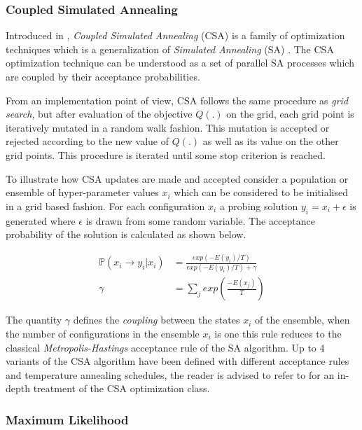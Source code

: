 \documentclass{article}
\begin{document}
\subsubsection*{Coupled Simulated Annealing}

Introduced in \citet{Xavier-De-Souza2010}, \emph{Coupled Simulated Annealing} (CSA) is a family of optimization techniques which is a generalization of \emph{Simulated Annealing} (SA) \citep{Kirkpatrick671}. The CSA optimization technique can be understood as a set of parallel SA processes which are coupled by their acceptance probabilities.

From an implementation point of view, CSA follows the same procedure as \emph{grid search}, but after evaluation of the objective $Q(.)$ on the grid, each grid point is iteratively mutated in a random walk fashion. This mutation is accepted or rejected according to the new value of $Q(.)$ as well as its value on the other grid points. This procedure is iterated until some stop criterion is reached.

To illustrate how CSA updates are made and accepted consider a population or ensemble of hyper-parameter values ${x_i}$ which can be considered to be initialised in a grid based fashion. For each configuration $x_i$ a probing solution $y_i = x_i + \epsilon$ is generated where $\epsilon$ is drawn from some random variable. The acceptance probability of the solution is calculated as shown below.

\begin{align*}
\mathbb{P}(x_i \rightarrow y_i | {x_i}) & = \frac{exp(-E(y_i)/T)}{exp(-E(y_i)/T) + \gamma} \\
\gamma & = \sum_{j}{exp \left ( \frac{-E(x_j)}{T} \right )}
\end{align*}

The quantity $\gamma$ defines the \emph{coupling} between the states ${x_i}$ of the ensemble, when the number of configurations in the ensemble $x_i$ is one this rule reduces to the classical \emph{Metropolis-Hastings} acceptance rule of the SA algorithm. Up to 4 variants of the CSA algorithm have been defined with different acceptance rules and temperature annealing schedules, the reader is advised to refer to \citet{Xavier-De-Souza2010} for an in-depth treatment of the CSA optimization class.  

\subsubsection*{Maximum Likelihood} 
\end{document}
